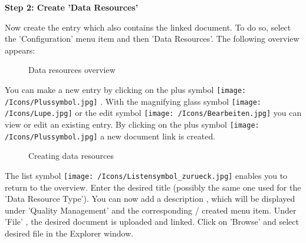 \textbf{Step 2: Create 'Data Resources'}

Now create the entry which also contains the linked document. To do so, select the 'Configuration' menu item and then 'Data Resources'. The following overview appears: 

\begin{figure}[H]
\caption{Data resources overview}
\end{figure}

You can make a new entry by clicking on the plus symbol \texttt{[image: /Icons/Plussymbol.jpg]} . With the magnifying glass symbol \texttt{[image: /Icons/Lupe.jpg]}  or the edit symbol \texttt{[image: /Icons/Bearbeiten.jpg]}  you can view or edit an existing entry. By clicking on the plus symbol \texttt{[image: /Icons/Plussymbol.jpg]}  a new document link is created. 

\begin{figure}[H]
\caption{Creating data resources}
\end{figure}

The list symbol \texttt{[image: /Icons/Listensymbol\_zurueck.jpg]}  enables you to return to the overview. Enter the desired title  (possibly the same one used for the 'Data Resource Type'). You can now add a description , which will be displayed under 'Quality Management' and the corresponding / created menu item. Under 'File' , the desired document is uploaded and linked. Click on 'Browse' and select desired file in the Explorer window.\\

